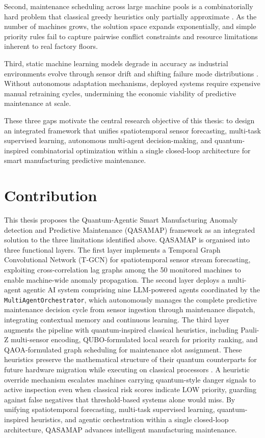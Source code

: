 Second, maintenance scheduling across large machine pools is a combinatorially hard problem that classical greedy heuristics only partially approximate \cite{dalyac_qualifying_2021}. As the number of machines grows, the solution space expands exponentially, and simple priority rules fail to capture pairwise conflict constraints and resource limitations inherent to real factory floors.

Third, static machine learning models degrade in accuracy as industrial environments evolve through sensor drift and shifting failure mode distributions \cite{lee_autoencoder-based_2024}. Without autonomous adaptation mechanisms, deployed systems require expensive manual retraining cycles, undermining the economic viability of predictive maintenance at scale.

These three gaps motivate the central research objective of this thesis: to design an integrated framework that unifies spatiotemporal sensor forecasting, multi-task supervised learning, autonomous multi-agent decision-making, and quantum-inspired combinatorial optimization within a single closed-loop architecture for smart manufacturing predictive maintenance.

\section{Contribution}

This thesis proposes the Quantum-Agentic Smart Manufacturing Anomaly detection and Predictive Maintenance (QASAMAP) framework as an integrated solution to the three limitations identified above. QASAMAP is organised into three functional layers. The first layer implements a Temporal Graph Convolutional Network (T-GCN) for spatiotemporal sensor stream forecasting, exploiting cross-correlation lag graphs among the 50 monitored machines to enable machine-wide anomaly propagation. The second layer deploys a multi-agent agentic AI system comprising nine LLM-powered agents coordinated by the \texttt{MultiAgentOrchestrator}, which autonomously manages the complete predictive maintenance decision cycle from sensor ingestion through maintenance dispatch, integrating contextual memory and continuous learning. The third layer augments the pipeline with quantum-inspired classical heuristics, including Pauli-Z multi-sensor encoding, QUBO-formulated local search for priority ranking, and QAOA-formulated graph scheduling for maintenance slot assignment. These heuristics preserve the mathematical structure of their quantum counterparts for future hardware migration while executing on classical processors \cite{Blekos2024, Preskill2018}. A heuristic override mechanism escalates machines carrying quantum-style danger signals to active inspection even when classical risk scores indicate LOW priority, guarding against false negatives that threshold-based systems alone would miss. By unifying spatiotemporal forecasting, multi-task supervised learning, quantum-inspired heuristics, and agentic orchestration within a single closed-loop architecture, QASAMAP advances intelligent manufacturing maintenance.

